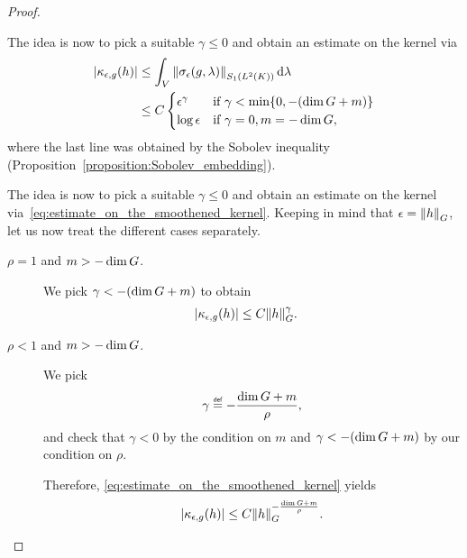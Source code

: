 \begin{proof}
\begin{description}
            The idea is now to pick a suitable $\gamma \leq 0$ and obtain an estimate on the kernel via
            \begin{align}
                \abs{\kappa_{\epsilon, g}(h)}
                &\leq \int_\VectorSpace \norm [\SchattenClasses 1 {\Lebesgue 2 \CompactGroup}] {\sigma_\epsilon(g, \lambda)} \dd \lambda \notag\\
                &\leq C
                \begin{cases}
                    \epsilon^{\gamma} & \text{if } \gamma < \min \{0, -(\dim \Group + m)\}\\
                    \log \epsilon & \text{if } \gamma = 0, m = -\dim \Group,
                \end{cases}
                \label{eq:estimate_on_the_smoothened_kernel}
            \end{align}
            where the last line was obtained by the Sobolev inequality (Proposition~\ref{proposition:Sobolev_embedding}).

            The idea is now to pick a suitable $\gamma \leq 0$ and obtain an estimate on the kernel via~\eqref{eq:estimate_on_the_smoothened_kernel}.
            Keeping in mind that $\epsilon = \norm [\Group] h$,
            let us now treat the different cases separately.
            \begin{description}
                \item[$\rho = 1$ and $m > -\dim \Group$.] We pick $\gamma < -(\dim \Group + m)$ to obtain
                    \begin{align*}
                        \abs {\kappa_{\epsilon, g}(h)}
                        &\leq C \norm [\Group] h^\gamma.
                    \end{align*}
                \item[$\rho < 1$ and $m > -\dim \Group$.]
                    We pick
                    \begin{align*}
                        \gamma \defeq -\frac {\dim \Group + m} \rho,
                    \end{align*}
                    and check that $\gamma < 0$ by the condition on $m$ and
                    $\gamma < -(\dim \Group + m)$ by our condition on $\rho$.

                    Therefore, \eqref{eq:estimate_on_the_smoothened_kernel} yields
                    \begin{align*}
                        \abs {\kappa_{\epsilon, g}(h)}
                        \leq C \norm [\Group] h^{-\frac {\dim \Group + m} {\rho}}.
                    \end{align*}


\end{description}
\end{description}
\end{proof}
